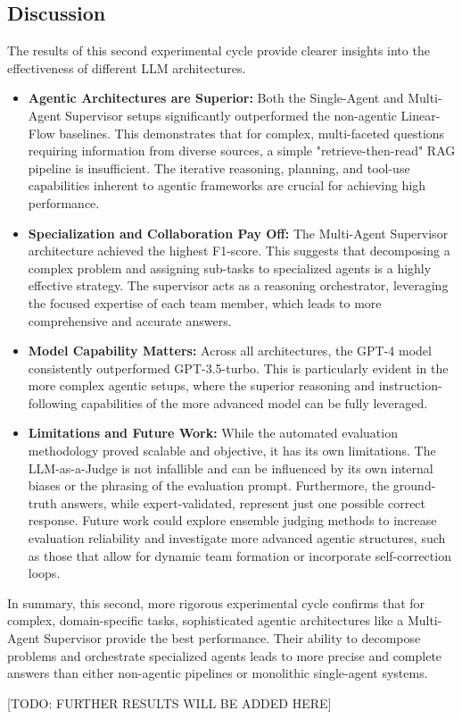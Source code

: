     \subsection{Discussion}

        The results of this second experimental cycle provide clearer insights into the effectiveness of different LLM architectures.
        \begin{itemize}
            \item \textbf{Agentic Architectures are Superior:} Both the Single-Agent and Multi-Agent Supervisor setups significantly outperformed the non-agentic Linear-Flow baselines. This demonstrates that for complex, multi-faceted questions requiring information from diverse sources, a simple "retrieve-then-read" RAG pipeline is insufficient. The iterative reasoning, planning, and tool-use capabilities inherent to agentic frameworks are crucial for achieving high performance.

            \item \textbf{Specialization and Collaboration Pay Off:} The Multi-Agent Supervisor architecture achieved the highest F1-score. This suggests that decomposing a complex problem and assigning sub-tasks to specialized agents is a highly effective strategy. The supervisor acts as a reasoning orchestrator, leveraging the focused expertise of each team member, which leads to more comprehensive and accurate answers.

            \item \textbf{Model Capability Matters:} Across all architectures, the GPT-4 model consistently outperformed GPT-3.5-turbo. This is particularly evident in the more complex agentic setups, where the superior reasoning and instruction-following capabilities of the more advanced model can be fully leveraged.

            \item \textbf{Limitations and Future Work:} While the automated evaluation methodology proved scalable and objective, it has its own limitations. The LLM-as-a-Judge is not infallible and can be influenced by its own internal biases or the phrasing of the evaluation prompt. Furthermore, the ground-truth answers, while expert-validated, represent just one possible correct response. Future work could explore ensemble judging methods to increase evaluation reliability and investigate more advanced agentic structures, such as those that allow for dynamic team formation or incorporate self-correction loops.
        \end{itemize}

        In summary, this second, more rigorous experimental cycle confirms that for complex, domain-specific tasks, sophisticated agentic architectures like a Multi-Agent Supervisor provide the best performance. Their ability to decompose problems and orchestrate specialized agents leads to more precise and complete answers than either non-agentic pipelines or monolithic single-agent systems.

        
        [TODO: FURTHER RESULTS WILL BE ADDED HERE]